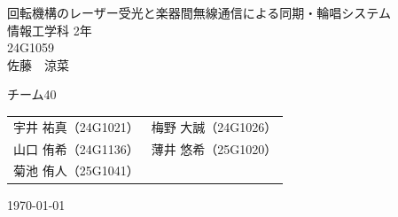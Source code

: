 \documentclass[uplatex,dvipdfmx]{jlreq}
\begin{document}
\begin{titlepage}
\vspace*{1cm}
\centering
\Huge\textsf{回転機構のレーザー受光と楽器間無線通信による同期・輪唱システム}\\[2cm]
\Large\textsf{情報工学科 2年}\\
\Large\textsf{24G1059}\\[5pt]
\huge\textsf{佐藤　涼菜}

\vspace*{1cm}
\Large\sffamily
\begin{itembox}[c]{チーム40}
\centering
\begin{tabular}{ll}
宇井 祐真（24G1021）&
梅野 大誠（24G1026）\\
山口 侑希（24G1136）&
薄井 悠希（25G1020）\\
菊池 侑人（25G1041）&\\
\end{tabular}
\end{itembox}

\vspace*{1cm}
\Large\textsf{\today}
\end{titlepage}
\clearpage









\newpage


\newpage



\appendix
\renewcommand{\thefigure}{A.\arabic{figure}} %
\renewcommand{\thetable}{A.\arabic{table}}   %
\renewcommand{\theequation}{\Alph{section}.\arabic{equation}} %






\end{document}
